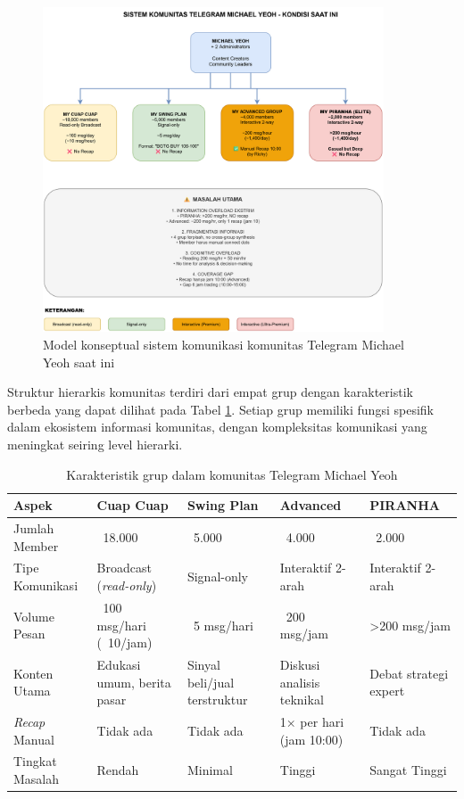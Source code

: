 \begin{figure}[H]
  \centering
  \includegraphics[width=0.9\textwidth]{image/current-state-diagram.png}
  \caption{Model konseptual sistem komunikasi komunitas Telegram Michael Yeoh saat ini}
  \label{fig:current-system}
\end{figure}

Struktur hierarkis komunitas terdiri dari empat grup dengan karakteristik berbeda yang dapat dilihat pada Tabel \ref{tab:group-characteristics}. Setiap grup memiliki fungsi spesifik dalam ekosistem informasi komunitas, dengan kompleksitas komunikasi yang meningkat seiring level hierarki.

\begin{table}[H]
\centering
\caption{Karakteristik grup dalam komunitas Telegram Michael Yeoh}
\label{tab:group-characteristics}
\begin{tabular}{|p{3cm}|p{2.5cm}|p{2.5cm}|p{3cm}|p{2.5cm}|}
\hline
\textbf{Aspek} & \textbf{Cuap Cuap} & \textbf{Swing Plan} & \textbf{Advanced} & \textbf{PIRANHA} \\
\hline
Jumlah Member & ~18.000 & ~5.000 & ~4.000 & ~2.000 \\
\hline
Tipe Komunikasi & Broadcast (\textit{read-only}) & Signal-only & Interaktif 2-arah & Interaktif 2-arah \\
\hline
Volume Pesan & ~100 msg/hari (~10/jam) & ~5 msg/hari & ~200 msg/jam & >200 msg/jam \\
\hline
Konten Utama & Edukasi umum, berita pasar & Sinyal beli/jual terstruktur & Diskusi analisis teknikal & Debat strategi expert \\
\hline
\textit{Recap} Manual & Tidak ada & Tidak ada & 1× per hari (jam 10:00) & Tidak ada \\
\hline
Tingkat Masalah & Rendah & Minimal & Tinggi & Sangat Tinggi \\
\hline
\end{tabular}
\end{table}

